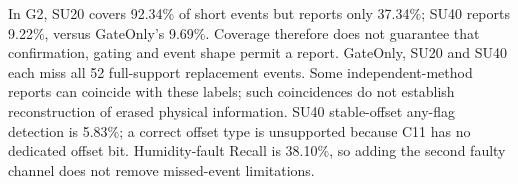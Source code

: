 In G2, SU20 covers 92.34\% of short events but reports only 37.34\%; SU40 reports 9.22\%, versus GateOnly's 9.69\%. Coverage therefore does not guarantee that confirmation, gating and event shape permit a report. GateOnly, SU20 and SU40 each miss all 52 full-support replacement events. Some independent-method reports can coincide with these labels; such coincidences do not establish reconstruction of erased physical information. SU40 stable-offset any-flag detection is 5.83\%; a correct offset type is unsupported because C11 has no dedicated offset bit. Humidity-fault Recall is 38.10\%, so adding the second faulty channel does not remove missed-event limitations.
